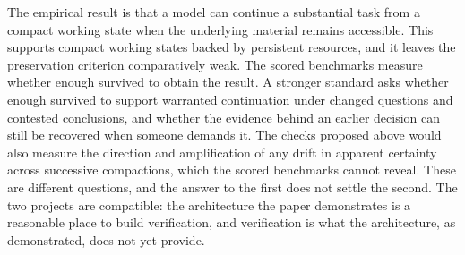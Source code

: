 \documentclass[11pt]{article}
\begin{document}
The empirical result is that a model can continue a substantial task from a compact working state when the underlying material remains accessible. This supports compact working states backed by persistent resources, and it leaves the preservation criterion comparatively weak. The scored benchmarks measure whether enough survived to obtain the result. A stronger standard asks whether enough survived to support warranted continuation under changed questions and contested conclusions, and whether the evidence behind an earlier decision can still be recovered when someone demands it. The checks proposed above would also measure the direction and amplification of any drift in apparent certainty across successive compactions, which the scored benchmarks cannot reveal. These are different questions, and the answer to the first does not settle the second. The two projects are compatible: the architecture the paper demonstrates is a reasonable place to build verification, and verification is what the architecture, as demonstrated, does not yet provide.
\end{document}
